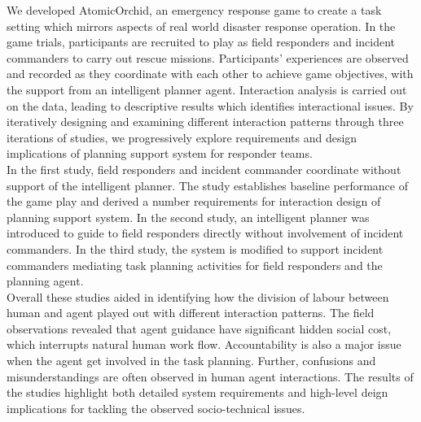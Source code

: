 We developed AtomicOrchid, an emergency response game to create a task setting which mirrors aspects of real world disaster response operation. In the game trials, participants are recruited to play as field responders and incident commanders to carry out rescue missions. Participants' experiences are observed and recorded as they coordinate with each other to achieve game objectives, with the support from an intelligent planner agent. Interaction analysis is carried out on the data, leading to descriptive results which identifies interactional issues. By iteratively designing and examining different interaction patterns through three iterations of studies, we progressively explore requirements and design implications of planning support system for responder teams.\\

In the first study, field responders and incident commander coordinate without support of the intelligent planner. The study establishes baseline performance of the game play and derived a number requirements for interaction design of planning support system. In the second study, an intelligent planner was introduced to guide to field responders directly without involvement of incident commanders. In the third study, the system is modified to support incident commanders mediating task planning activities for field responders and the planning agent. \\

Overall these studies aided in identifying how the division of labour between human and agent played out with different interaction patterns. The field observations revealed that agent guidance have significant hidden social cost, which interrupts natural human work flow. Accountability is also a major issue when the agent get involved in the task planning. Further, confusions and misunderstandings are often observed in human agent interactions. The results of the studies highlight both detailed system requirements and high-level deign implications for tackling the observed socio-technical issues.\\  


\endgroup			

\vfill